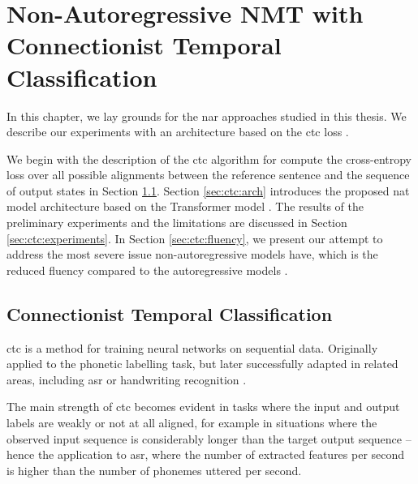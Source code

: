 \chapter{Non-Autoregressive NMT with Connectionist Temporal Classification}
\label{chap:nar-nmt-ctc}


\noindent
In this chapter, we lay grounds for the \ac{nar} approaches studied in this
thesis. We describe our experiments with an architecture based on the \ac{ctc}
loss \citep{libovicky-helcl-2018-end}.  


We begin with the description of the \ac{ctc} algorithm for compute the
cross-entropy loss over all possible alignments between the reference sentence
and the sequence of output states in Section \ref{sec:ctc}. Section
\ref{sec:ctc:arch} introduces the proposed \ac{nat} model architecture based on
the Transformer model \citep{vaswani2017attention}. The results of the
preliminary experiments and the limitations are discussed in Section
\ref{sec:ctc:experiments}. In Section \ref{sec:ctc:fluency}, we present our
attempt to address the most severe issue non-autoregressive models have, which
is the reduced fluency compared to the autoregressive models
\citep{kasner2020improving,kasner2020incorporating}.

\section{Connectionist Temporal Classification}
\label{sec:ctc}

\Ac{ctc} \citep{graves2006connectionist} is a method for training neural
networks on sequential data. Originally applied to the phonetic labelling task,
but later successfully adapted in related areas, including \ac{asr} or
handwriting recognition \citep{liwicki2007novel, eyben2009speech,
  graves2014towards}.

The main strength of \ac{ctc} becomes evident in tasks where the input and
output labels are weakly or not at all aligned, for example in situations where
the observed input sequence is considerably longer than the target output
sequence -- hence the application to \ac{asr}, where the number of extracted
features per second is higher than the number of phonemes uttered per second.

